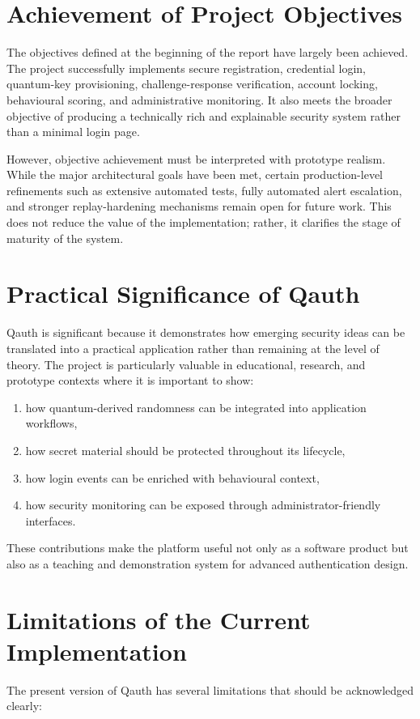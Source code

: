 \section{Achievement of Project Objectives}
The objectives defined at the beginning of the report have largely been achieved. The project successfully implements secure registration, credential login, quantum-key provisioning, challenge-response verification, account locking, behavioural scoring, and administrative monitoring. It also meets the broader objective of producing a technically rich and explainable security system rather than a minimal login page.

However, objective achievement must be interpreted with prototype realism. While the major architectural goals have been met, certain production-level refinements such as extensive automated tests, fully automated alert escalation, and stronger replay-hardening mechanisms remain open for future work. This does not reduce the value of the implementation; rather, it clarifies the stage of maturity of the system.

\section{Practical Significance of Qauth}
Qauth is significant because it demonstrates how emerging security ideas can be translated into a practical application rather than remaining at the level of theory. The project is particularly valuable in educational, research, and prototype contexts where it is important to show:

\begin{enumerate}
    \item how quantum-derived randomness can be integrated into application workflows,
    \item how secret material should be protected throughout its lifecycle,
    \item how login events can be enriched with behavioural context,
    \item how security monitoring can be exposed through administrator-friendly interfaces.
\end{enumerate}

These contributions make the platform useful not only as a software product but also as a teaching and demonstration system for advanced authentication design.

\section{Limitations of the Current Implementation}
The present version of Qauth has several limitations that should be acknowledged clearly:

